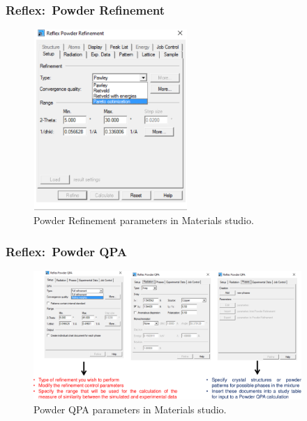 \frame
{
	\frametitle{\textrm{Reflex:~Powder Refinement}}
\begin{figure}[h!]
\centering
\vspace*{-0.18in}
\includegraphics[height=2.70in,width=2.30in,viewport=0 0 620 732,clip]{Figures/MS-Analysis_Reflex_Powder-Refinement.png}
\caption{\tiny \textrm{Powder Refinement parameters in Materials studio.}}%
\label{Reflex-Powder-Refinement}
\end{figure}
}

\frame
{
	\frametitle{\textrm{Reflex:~Powder QPA}}
\begin{figure}[h!]
\centering
\includegraphics[height=1.92in,width=4.00in,viewport=0 0 1296 621,clip]{Figures/MS-Analysis_Reflex_Powder-QPA.png}
\caption{\tiny \textrm{Powder QPA parameters in Materials studio.}}%
\label{Reflex-Powder-QPA}
\end{figure}
}

